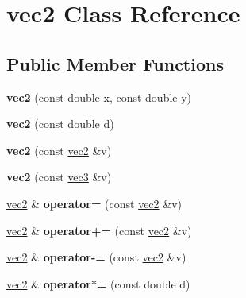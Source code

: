 \hypertarget{classvec2}{
\section{vec2 Class Reference}
\label{classvec2}
}
\subsection*{Public Member Functions}
\begin{DoxyCompactItemize}
\item 
\hypertarget{classvec2_aa2968d185a9472076ecc8fa130cb6b20}{
{\bfseries vec2} (const double x, const double y)}
\label{classvec2_aa2968d185a9472076ecc8fa130cb6b20}

\item 
\hypertarget{classvec2_ab793b68e5140bcc3822827774d8e3351}{
{\bfseries vec2} (const double d)}
\label{classvec2_ab793b68e5140bcc3822827774d8e3351}

\item 
\hypertarget{classvec2_a7cd74dc60ec8bd02df85508cbdf1e0fd}{
{\bfseries vec2} (const \hyperlink{classvec2}{vec2} \&v)}
\label{classvec2_a7cd74dc60ec8bd02df85508cbdf1e0fd}

\item 
\hypertarget{classvec2_aae5f9f22b370adf75cd730c96c891c15}{
{\bfseries vec2} (const \hyperlink{classvec3}{vec3} \&v)}
\label{classvec2_aae5f9f22b370adf75cd730c96c891c15}

\item 
\hypertarget{classvec2_aa287a5be89cde7e32c38f31d60667efd}{
\hyperlink{classvec2}{vec2} \& {\bfseries operator=} (const \hyperlink{classvec2}{vec2} \&v)}
\label{classvec2_aa287a5be89cde7e32c38f31d60667efd}

\item 
\hypertarget{classvec2_a67b9be8b71f13abba9d2cf7a41540a9d}{
\hyperlink{classvec2}{vec2} \& {\bfseries operator+=} (const \hyperlink{classvec2}{vec2} \&v)}
\label{classvec2_a67b9be8b71f13abba9d2cf7a41540a9d}

\item 
\hypertarget{classvec2_aeb9ecb6878a3d8a04ecb5a00daf19742}{
\hyperlink{classvec2}{vec2} \& {\bfseries operator-\/=} (const \hyperlink{classvec2}{vec2} \&v)}
\label{classvec2_aeb9ecb6878a3d8a04ecb5a00daf19742}

\item 
\hypertarget{classvec2_a45c4216bd934cce3db28fb211663690b}{
\hyperlink{classvec2}{vec2} \& {\bfseries operator$\ast$=} (const double d)}
\label{classvec2_a45c4216bd934cce3db28fb211663690b}


\end{DoxyCompactItemize}
